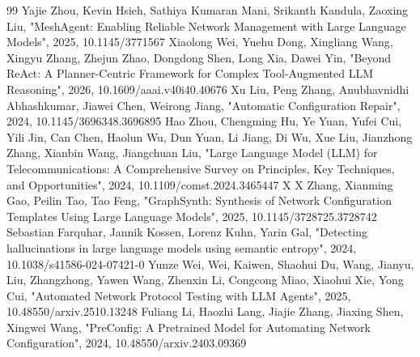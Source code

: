 \documentclass[conference]{IEEEtran}
\begin{document}
\begin{thebibliography}{99}
 Yajie Zhou, Kevin Hsieh, Sathiya Kumaran Mani, Srikanth Kandula, Zaoxing Liu, "MeshAgent: Enabling Reliable Network Management with Large Language Models", 2025, 10.1145/3771567
 Xiaolong Wei, Yuehu Dong, Xingliang Wang, Xingyu Zhang, Zhejun Zhao, Dongdong Shen, Long Xia, Dawei Yin, "Beyond ReAct: A Planner-Centric Framework for Complex Tool-Augmented LLM Reasoning", 2026, 10.1609/aaai.v40i40.40676
 Xu Liu, Peng Zhang, Anubhavnidhi Abhashkumar, Jiawei Chen, Weirong Jiang, "Automatic Configuration Repair", 2024, 10.1145/3696348.3696895
 Hao Zhou, Chengming Hu, Ye Yuan, Yufei Cui, Yili Jin, Can Chen, Haolun Wu, Dun Yuan, Li Jiang, Di Wu, Xue Liu, Jianzhong Zhang, Xianbin Wang, Jiangchuan Liu, "Large Language Model (LLM) for Telecommunications: A Comprehensive Survey on Principles, Key Techniques, and Opportunities", 2024, 10.1109/comst.2024.3465447
 X X Zhang, Xianming Gao, Peilin Tao, Tao Feng, "GraphSynth: Synthesis of Network Configuration Templates Using Large Language Models", 2025, 10.1145/3728725.3728742
 Sebastian Farquhar, Jannik Kossen, Lorenz Kuhn, Yarin Gal, "Detecting hallucinations in large language models using semantic entropy", 2024, 10.1038/s41586-024-07421-0
 Yunze Wei, Wei, Kaiwen, Shaohui Du, Wang, Jianyu, Liu, Zhangzhong, Yawen Wang, Zhenxin Li, Congcong Miao, Xiaohui Xie, Yong Cui, "Automated Network Protocol Testing with LLM Agents", 2025, 10.48550/arxiv.2510.13248
 Fuliang Li, Haozhi Lang, Jiajie Zhang, Jiaxing Shen, Xingwei Wang, "PreConfig: A Pretrained Model for Automating Network Configuration", 2024, 10.48550/arxiv.2403.09369
\end{thebibliography}
\end{document}
